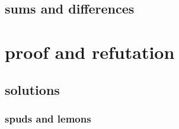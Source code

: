 \documentclass{book}
\begin{document}
\chapter{sums and differences}


\part{proof and refutation}




\appendix


\chapter{solutions}

\newtheorem{sol}{Solution}[section]

\section{spuds and lemons}
\end{document}
